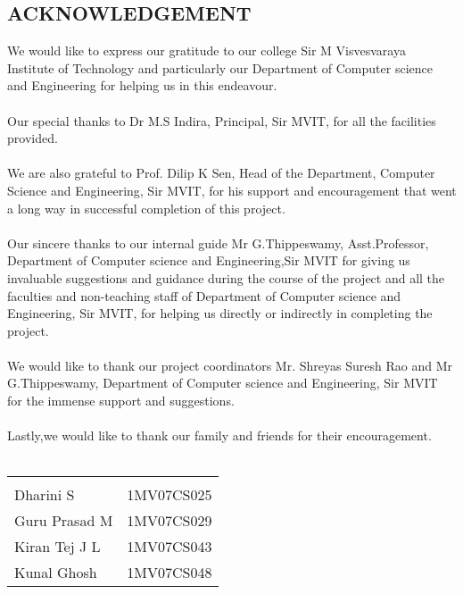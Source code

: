 \documentclass[10pt,a4paper]{article}
\newcommand{\tab}{\hspace*{4 cm}}
\begin{document}
\begin{center}
\section*{ACKNOWLEDGEMENT \\}
\end{center}

We would like to express our gratitude to our college Sir M Visvesvaraya Institute of Technology and particularly our Department of Computer science and Engineering for helping us in this endeavour. \\ \\

Our special thanks to Dr M.S Indira, Principal, Sir MVIT, for all the facilities provided. \\ \\

We are also grateful to Prof. Dilip K Sen, Head of the Department, Computer Science and Engineering, Sir MVIT, for his support and encouragement that went a long way in successful completion of this project. \\ \\

Our sincere thanks to our internal guide Mr G.Thippeswamy, Asst.Professor, Department of Computer science and Engineering,Sir MVIT for giving us invaluable suggestions and guidance during the course of the project and all the faculties and non-teaching staff of Department of Computer science and Engineering, Sir MVIT, for helping us directly or indirectly in completing the project. \\ \\ 

We would like to thank our project coordinators Mr. Shreyas Suresh Rao and Mr G.Thippeswamy, Department of Computer science and Engineering, Sir MVIT for the immense support and suggestions. \\ \\ 
Lastly,we would like to thank our family and friends for their encouragement. \\ \\

\begin{table}[h]

\begin{tabular}{lr} \\

\\
Dharini S \tab & 1MV07CS025   \\
Guru Prasad M \tab & 1MV07CS029   \\
Kiran Tej J L  \tab & 1MV07CS043  \\
Kunal Ghosh \tab &  1MV07CS048   \\ 
\end{tabular}
\end{table}
\end{document}
